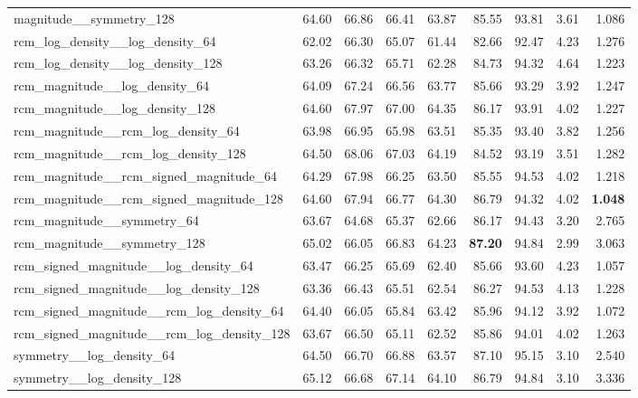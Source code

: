 \begin{table}[H]
{\begin{tabular}{lrrrrrrrr}
    magnitude\_\_symmetry\_128                        & 64.60 & 66.86 & 66.41 & 63.87 & 85.55 & 93.81 & 3.61 & 1.086 \\
    rcm\_log\_density\_\_log\_density\_64             & 62.02 & 66.30 & 65.07 & 61.44 & 82.66 & 92.47 & 4.23 & 1.276 \\
    rcm\_log\_density\_\_log\_density\_128            & 63.26 & 66.32 & 65.71 & 62.28 & 84.73 & 94.32 & 4.64 & 1.223 \\
    rcm\_magnitude\_\_log\_density\_64                & 64.09 & 67.24 & 66.56 & 63.77 & 85.66 & 93.29 & 3.92 & 1.247 \\
    rcm\_magnitude\_\_log\_density\_128               & 64.60 & 67.97 & 67.00 & 64.35 & 86.17 & 93.91 & 4.02 & 1.227 \\
    rcm\_magnitude\_\_rcm\_log\_density\_64           & 63.98 & 66.95 & 65.98 & 63.51 & 85.35 & 93.40 & 3.82 & 1.256 \\
    rcm\_magnitude\_\_rcm\_log\_density\_128          & 64.50 & 68.06 & 67.03 & 64.19 & 84.52 & 93.19 & 3.51 & 1.282 \\
    rcm\_magnitude\_\_rcm\_signed\_magnitude\_64      & 64.29 & 67.98 & 66.25 & 63.50 & 85.55 & 94.53 & 4.02 & 1.218 \\
    rcm\_magnitude\_\_rcm\_signed\_magnitude\_128     & 64.60 & 67.94 & 66.77 & 64.30 & 86.79 & 94.32 & 4.02 & \textbf{1.048} \\
    rcm\_magnitude\_\_symmetry\_64                    & 63.67 & 64.68 & 65.37 & 62.66 & 86.17 & 94.43 & 3.20 & 2.765 \\
    rcm\_magnitude\_\_symmetry\_128                   & 65.02 & 66.05 & 66.83 & 64.23 & \textbf{87.20} & 94.84 & 2.99 & 3.063 \\
    rcm\_signed\_magnitude\_\_log\_density\_64        & 63.47 & 66.25 & 65.69 & 62.40 & 85.66 & 93.60 & 4.23 & 1.057 \\
    rcm\_signed\_magnitude\_\_log\_density\_128       & 63.36 & 66.43 & 65.51 & 62.54 & 86.27 & 94.53 & 4.13 & 1.228 \\
    rcm\_signed\_magnitude\_\_rcm\_log\_density\_64   & 64.40 & 66.05 & 65.84 & 63.42 & 85.96 & 94.12 & 3.92 & 1.072 \\
    rcm\_signed\_magnitude\_\_rcm\_log\_density\_128  & 63.67 & 66.50 & 65.11 & 62.52 & 85.86 & 94.01 & 4.02 & 1.263 \\
    symmetry\_\_log\_density\_64                      & 64.50 & 66.70 & 66.88 & 63.57 & 87.10 & 95.15 & 3.10 & 2.540 \\
    symmetry\_\_log\_density\_128                     & 65.12 & 66.68 & 67.14 & 64.10 & 86.79 & 94.84 & 3.10 & 3.336 \\

\end{tabular}}
\end{table}
